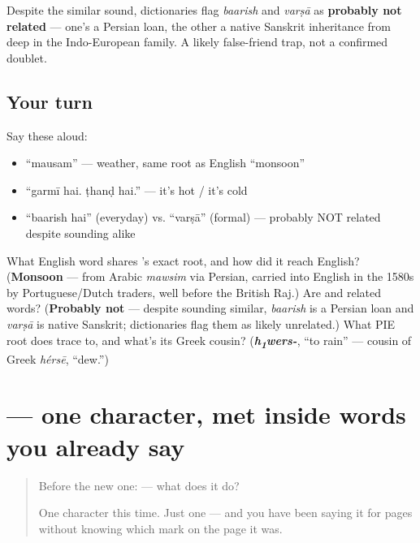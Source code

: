 Despite the similar sound, dictionaries flag \emph{baarish} and \emph{varṣā} as \textbf{probably not related} — one's a Persian loan, the other a native Sanskrit inheritance from deep in the Indo-European family. A likely false-friend trap, not a confirmed doublet.

\subsection*{Your turn}
Say these aloud:

\begin{itemize}
\raggedright
  \item \textquotedblleft{}mausam\textquotedblright{} — weather, same root as English \textquotedblleft{}monsoon\textquotedblright{}
  \item \textquotedblleft{}garmī hai. ṭhanḍ hai.\textquotedblright{} — it's hot / it's cold
  \item \textquotedblleft{}baarish hai\textquotedblright{} (everyday) vs. \textquotedblleft{}varṣā\textquotedblright{} (formal) — probably NOT related despite sounding alike
\end{itemize}

\begin{tcolorbox}[breakable,colback=teal!4,colframe=teal!35!black,title={Before you move on}]
What English word shares 's exact root, and how did it reach English? (\textbf{Monsoon} — from Arabic \emph{mawsim} via Persian, carried into English in the 1580s by Portuguese/Dutch traders, well before the British Raj.) Are \textbf{} and \textbf{} related words? (\textbf{Probably not} — despite sounding similar, \emph{baarish} is a Persian loan and \emph{varṣā} is native Sanskrit; dictionaries flag them as likely unrelated.) What PIE root does \textbf{} trace to, and what's its Greek cousin? (\emph{\textbf{h\textsubscript{1}wers-}}, \textquotedblleft{}to rain\textquotedblright{} — cousin of Greek \emph{hérsē}, \textquotedblleft{}dew.\textquotedblright{})
\end{tcolorbox}
\section[\texorpdfstring{\hi{ध} (dha)}{ध (dha)}]{ — one character, met inside words you already say}

\label{lesson:HI-S124-letter-dha}



\begin{quote}
Before the new one:  — what does it do?

One character this time. Just one — and you have been saying it for pages without knowing which mark on the page it was.
\end{quote}


